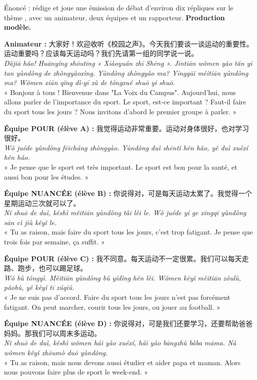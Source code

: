 \documentclass[11pt]{article}
\newcommand{\zh}[1]{\ifmmode\text{#1}\else{#1}\fi}
\begin{document}
\begin{exoresolu}
Énoncé : rédige et joue une émission de débat d'environ dix répliques sur le thème \zh{运动重要吗？}, avec un animateur, deux équipes et un rapporteur.
\tcblower
\textbf{Production modèle.}

\textbf{Animateur :} 大家好！欢迎收听《校园之声》。今天我们要谈一谈运动的重要性。运动重要吗？应该每天运动吗？我们先请第一组的同学说一说。\\
\emph{Dàjiā hǎo! Huānyíng shōutīng « Xiàoyuán zhī Shēng ». Jīntiān wǒmen yào tán yi tan yùndòng de zhòngyàoxìng. Yùndòng zhòngyào ma? Yīnggāi měitiān yùndòng ma? Wǒmen xiān qǐng dì-yī zǔ de tóngxué shuō yi shuō.}\\
« Bonjour à tous ! Bienvenue dans "La Voix du Campus". Aujourd'hui, nous allons parler de l'importance du sport. Le sport, est-ce important ? Faut-il faire du sport tous les jours ? Nous invitons d'abord le premier groupe à parler. »

\textbf{Équipe POUR (élève A) :} 我觉得运动非常重要。运动对身体很好，也对学习很好。\\
\emph{Wǒ juéde yùndòng fēicháng zhòngyào. Yùndòng duì shēntǐ hěn hǎo, yě duì xuéxí hěn hǎo.}\\
« Je pense que le sport est très important. Le sport est bon pour la santé, et aussi bon pour les études. »

\textbf{Équipe NUANCÉE (élève B) :} 你说得对，可是每天运动太累了。我觉得一个星期运动三次就可以了。\\
\emph{Nǐ shuō de duì, kěshì měitiān yùndòng tài lèi le. Wǒ juéde yí ge xīngqī yùndòng sān cì jiù kěyǐ le.}\\
« Tu as raison, mais faire du sport tous les jours, c'est trop fatigant. Je pense que trois fois par semaine, ça suffit. »

\textbf{Équipe POUR (élève C) :} 我不同意。每天运动不一定很累。我们可以每天走路、跑步，也可以踢足球。\\
\emph{Wǒ bù tóngyì. Měitiān yùndòng bù yídìng hěn lèi. Wǒmen kěyǐ měitiān zǒulù, pǎobù, yě kěyǐ tī zúqiú.}\\
« Je ne suis pas d'accord. Faire du sport tous les jours n'est pas forcément fatigant. On peut marcher, courir tous les jours, ou jouer au football. »

\textbf{Équipe NUANCÉE (élève D) :} 你说得对，可是我们还要学习，还要帮助爸爸妈妈。那我们可以周末多运动。\\
\emph{Nǐ shuō de duì, kěshì wǒmen hái yào xuéxí, hái yào bāngzhù bàba māma. Nà wǒmen kěyǐ zhōumò duō yùndòng.}\\
« Tu as raison, mais nous devons aussi étudier et aider papa et maman. Alors nous pouvons faire plus de sport le week-end. »


\end{exoresolu}
\end{document}
